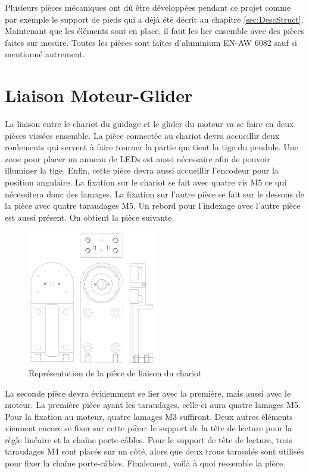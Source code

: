 Plusieurs pièces mécaniques ont dû être développées pendant ce projet comme par exemple le support de pieds  qui a déjà été décrit au chapitre \ref{sec:DescStruct}.
Maintenant que les éléments sont en place, il faut les lier ensemble avec des pièces faites sur mesure. Toutes les pièces sont faîtes
d'aluminium EN-AW 6082 sauf si mentionné autrement.

\section{Liaison Moteur-Glider}\label{sec:LiaisonMotGlid}
La liaison entre le chariot du guidage et le \gls{glider} du moteur va se faire en deux pièces vissées ensemble. La pièce
connectée au chariot devra accueillir deux roulements qui servent à faire tourner la partie qui tient la tige du pendule. Une zone pour placer
un anneau de LEDs est aussi nécessaire afin de pouvoir illuminer la tige. Enfin, cette pièce devra aussi accueillir l'encodeur pour la position
angulaire. La fixation sur le chariot se fait avec quatre vis M5 ce qui nécessitera donc des lamages. La fixation sur l'autre pièce se fait sur
le dessous de la pièce avec quatre taraudages M5. Un rebord pour l'indexage avec l'autre pièce est aussi présent. On obtient la pièce suivante.

\begin{figure}[H]
  \centering
  \includegraphics[width = 0.5\textwidth]{assets/figures/LiaisonChariot.svg}
  \caption{Représentation de la pièce de liaison du chariot}
  \label{fig:LiaisonChariot}
\end{figure}

La seconde pièce devra évidemment se lier avec la première, mais aussi avec le moteur. La première pièce ayant les taraudages, celle-ci aura quatre
lamages M5. Pour la fixation au moteur, quatre lamages M3 suffiront. Deux autres éléments viennent encore se fixer sur cette pièce: le support de
la tête de lecture pour la règle linéaire et la chaîne porte-câbles. Pour le support de tête de lecture, trois taraudages M4 sont placés sur un côté,
alors que deux trous taraudés sont utilisés pour fixer la chaîne porte-câbles. Finalement, voilà à quoi ressemble la pièce.

